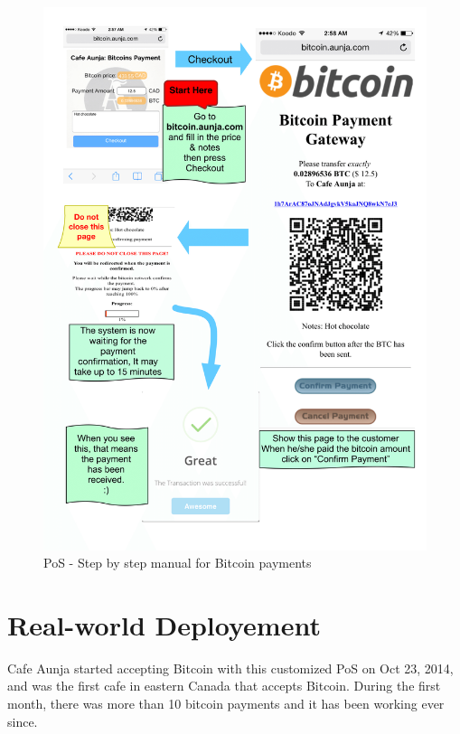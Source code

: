 \begin{figure}[htb!p]
\centering
\includegraphics[width=\linewidth]{fig/Payment_manual.png}
  \caption{PoS - Step by step manual for Bitcoin payments}
\label{fig:payment_manual}
\end{figure}



\section{Real-world Deployement}
Cafe Aunja started accepting Bitcoin with this customized PoS on Oct 23, 2014, and was the first cafe in eastern Canada that accepts Bitcoin. During the first month, there was more than 10 bitcoin payments and it has been working ever since.

